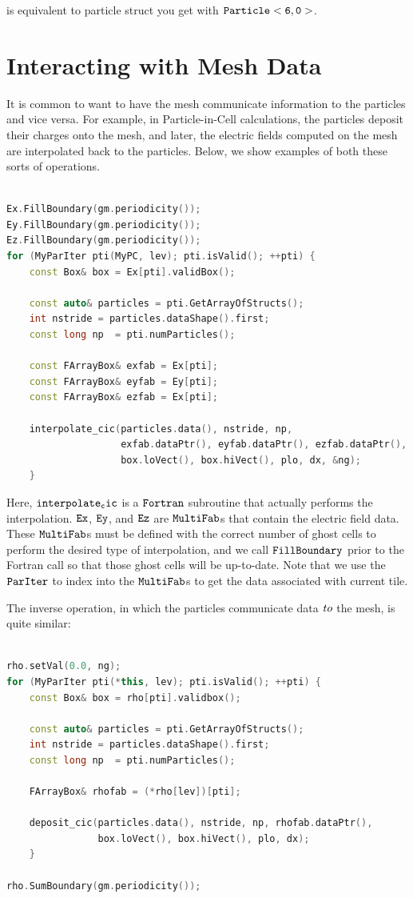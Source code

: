 is equivalent to particle struct you get with $\tt{Particle<6, 0>}$.

\section{Interacting with Mesh Data}
\label{sec:Particles:Interacting}

It is common to want to have the mesh communicate information to the particles and vice versa. For example, in Particle-in-Cell calculations, the particles deposit their charges onto the mesh, and later, the electric fields computed on the mesh are interpolated back to the particles. Below, we show examples of both these sorts of operations.

\begin{lstlisting}[language=cpp]

Ex.FillBoundary(gm.periodicity());
Ey.FillBoundary(gm.periodicity());
Ez.FillBoundary(gm.periodicity());
for (MyParIter pti(MyPC, lev); pti.isValid(); ++pti) {
    const Box& box = Ex[pti].validBox();

    const auto& particles = pti.GetArrayOfStructs();
    int nstride = particles.dataShape().first;
    const long np  = pti.numParticles();

    const FArrayBox& exfab = Ex[pti];
    const FArrayBox& eyfab = Ey[pti];
    const FArrayBox& ezfab = Ex[pti];

    interpolate_cic(particles.data(), nstride, np,
                    exfab.dataPtr(), eyfab.dataPtr(), ezfab.dataPtr(),
                    box.loVect(), box.hiVect(), plo, dx, &ng);
    }

\end{lstlisting}

Here, $\tt{interpolate_cic}$ is a $\tt{Fortran}$ subroutine that actually performs the interpolation. $\tt{Ex}$, $\tt{Ey}$, and $\tt{Ez}$ are $\tt{MultiFab}$s
that contain the electric field data. These $\tt{MultiFab}$s must be defined with the correct number of ghost cells to perform the desired type of interpolation,
and we call $\tt{FillBoundary}$ prior to the Fortran call so that those ghost cells will be up-to-date. Note that we use the $\tt{ParIter}$ to index into the 
$\tt{MultiFab}$s to get the data associated with current tile.

The inverse operation, in which the particles communicate data $\emph{to}$ the mesh, is quite similar:

\begin{lstlisting}[language=cpp]

rho.setVal(0.0, ng);
for (MyParIter pti(*this, lev); pti.isValid(); ++pti) {
    const Box& box = rho[pti].validbox();

    const auto& particles = pti.GetArrayOfStructs();
    int nstride = particles.dataShape().first;
    const long np  = pti.numParticles();

    FArrayBox& rhofab = (*rho[lev])[pti];

    deposit_cic(particles.data(), nstride, np, rhofab.dataPtr(), 
                box.loVect(), box.hiVect(), plo, dx);
    }

rho.SumBoundary(gm.periodicity());

\end{lstlisting}

